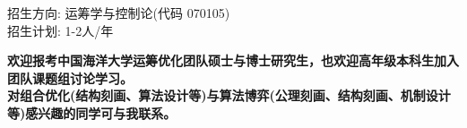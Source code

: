 %
%


{
招生方向: 运筹学与控制论(代码 070105)\\
招生计划: 1-2人/年

\textcolor{BrickRed}{\textbf{欢迎报考中国海洋大学运筹优化团队硕士与博士研究生，也欢迎高年级本科生加入团队课题组讨论学习。\\
对组合优化(结构刻画、算法设计等)与算法博弈(公理刻画、结构刻画、机制设计等)感兴趣的同学可与我联系。}}

}